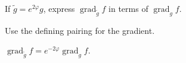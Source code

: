 \begin{exercise}\label{exr:vii20-ped-16}
If \(\widetilde g=e^{2\varphi}g\), express \(\operatorname{grad}_{\widetilde g}f\) in terms of \(\operatorname{grad}_g f\).
\end{exercise}

\begin{hint}
Use the defining pairing for the gradient.
\end{hint}

\begin{solution}
\(\operatorname{grad}_{\widetilde g}f=e^{-2\varphi}\operatorname{grad}_g f\).
\end{solution}

